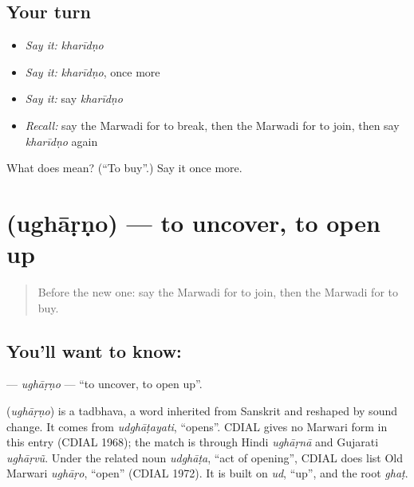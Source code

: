\subsection*{Your turn}
\begin{itemize}
\raggedright
  \item \emph{Say it:} \emph{kharīdṇo}
  \item \emph{Say it:} \emph{kharīdṇo}, once more
  \item \emph{Say it:} say \emph{kharīdṇo}
  \item \emph{Recall:} say the Marwadi for to break, then the Marwadi for to join, then say \emph{kharīdṇo} again
\end{itemize}

\begin{tcolorbox}[breakable,colback=teal!4,colframe=teal!35!black,title={Before you move on}]
What does  mean? (\textquotedblleft{}To buy\textquotedblright{}.) Say it once more.
\end{tcolorbox}
\section[\texorpdfstring{\mw{उघाड़णो} (ughāṛṇo)}{उघाड़णो (ughāṛṇo)}]{ (ughāṛṇo) — to uncover, to open up}

\label{lesson:MW-C104-ugharno}



\begin{quote}
Before the new one: say the Marwadi for to join, then the Marwadi for to buy.
\end{quote}

\subsection*{You'll want to know: }
\textbf{} — \emph{ughāṛṇo} — \textquotedblleft{}to uncover, to open up\textquotedblright{}.

\begin{cousinweb}
\textbf{} (\emph{ughāṛṇo}) is a tadbhava, a word inherited from Sanskrit and reshaped by sound change. It comes from \emph{udghāṭayati}, \textquotedblleft{}opens\textquotedblright{}. CDIAL gives no Marwari form in this entry (CDIAL 1968); the match is through Hindi \emph{ughāṛnā} and Gujarati \emph{ughāṛvũ}. Under the related noun \emph{udghāṭa}, \textquotedblleft{}act of opening\textquotedblright{}, CDIAL does list Old Marwari \emph{ughāṛo}, \textquotedblleft{}open\textquotedblright{} (CDIAL 1972). It is built on \emph{ud}, \textquotedblleft{}up\textquotedblright{}, and the root \emph{ghaṭ}.
\end{cousinweb}

